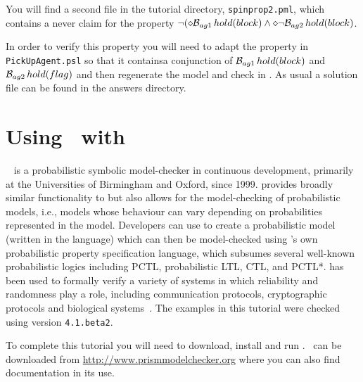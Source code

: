 \documentclass[a4]{article}
\begin{document}
You will find a second file in the tutorial directory, \texttt{spinprop2.pml}, which contains a never claim for the property $\neg (\diamond \mathrm{{\cal B}}_{ag1} \, hold(block) \wedge \diamond \neg \mathrm{{\cal B}}_{ag2} \, hold(block)$.

In order to verify this property you will need to adapt the property in \texttt{PickUpAgent.psl} so that it containsa  conjunction of $\mathrm{{\cal B}}_{ag1} \, hold(block)$ and $\mathrm{{\cal B}}_{ag2} \, hold(flag)$ and then regenerate the model and check in \spin.  As usual a solution file can be found in the answers directory.

\section{Using \ajpf\ with \prism}
\prism{}~\cite{KNP11} is a probabilistic symbolic model-checker in
continuous development, primarily at the Universities of Birmingham
and Oxford, since 1999. \prism{} provides broadly similar
functionality to \spin{} but also allows for the model-checking of
probabilistic models, i.e., models whose behaviour can vary depending
on probabilities represented in the model. Developers can use \prism{} to
create a probabilistic model (written in the \prism{} language) which
can then be model-checked using \prism{}'s own probabilistic property
specification language, which subsumes several well-known
probabilistic logics including PCTL, probabilistic LTL, CTL, and
PCTL*.  \prism{} has been used to formally verify a variety of systems
in which reliability and randomness play a role, including
communication protocols, cryptographic protocols and biological
systems~\cite{PRISM:url}. The examples in this tutorial were checked using \prism{} version
\texttt{4.1.beta2}.

To complete this tutorial you will need to download, install and run \prism.  \prism\ can be downloaded from \url{http://www.prismmodelchecker.org} where you can also find documentation in its use.


\end{document}
